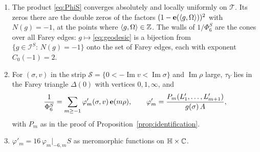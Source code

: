 \begin{proposition}\label{prop:PhiS}
\begin{enumerate}
\item[(i)] The product \eqref{eq:PhiS} converges absolutely and locally uniformly on $\mathcal T$. Its zeros there are the double zeros of the factors $(1-\mathbf e(\langle g,\Omega\rangle))^2$ with $N(g)=-1$, at the points where $\langle g,\Omega\rangle\in\mathbb{Z}$. The walls of $1/\Phi^S_6$ are the cones over all Farey edges: $g\mapsto$\eqref{eq:geodesic} is a bijection from $\{g\in\mathcal I^S:\,N(g)=-1\}$ onto the set of Farey edges, each with exponent $C_0(-1)=2$.
\item[(ii)] For $(\sigma,v)$ in the strip $\mathcal S=\{0<-\operatorname{Im}v<\operatorname{Im}\sigma\}$ and $\operatorname{Im}\rho$ large, $\tau_Y$ lies in the Farey triangle $\Delta(0)$ with vertices $0,1,\infty$, and
\[
\frac1{\Phi^S_6}=\sum_{m\ge-1}\varphi'_m(\sigma,v)\,\mathbf e(m\rho),\qquad \varphi'_m=\frac{P_m(L'_1,\dots,L'_{m+1})}{g(\sigma)\,A},
\]
with $P_m$ as in the proof of Proposition~\ref{prop:identification}.
\item[(iii)] $\varphi'_m=16\,\varphi_m|_{-6,m}S$ as meromorphic functions on $\mathbb H\times\mathbb{C}$.
\end{enumerate}
\end{proposition}

